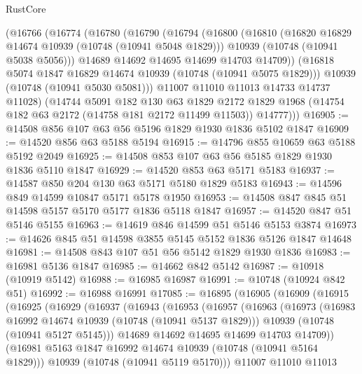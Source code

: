 \begin{lexlean}{RustCore}
\begin{coremodule}
    (@16766
      (@16774
        (@16780
          (@16790
            (@16794
              (@16800
                (@16810
                  (@16820 @16829 @14674 @10939 (@10748 (@10941 @5048 @1829)))
                  @10939
                  (@10748 (@10941 @5038 @5056)))
                @14689
                @14692
                @14695
                @14699
                @14703
                @14709))
            (@16818 @5074 @1847 @16829 @14674 @10939 (@10748 (@10941 @5075 @1829)))
            @10939
            (@10748 (@10941 @5030 @5081)))
          @11007
          @11010
          @11013
          @14733
          @14737
          @11028)
        (@14744
          @5091
          @182
          @130
          @63
          @1829
          @2172
          @1829
          @1968
          (@14754 @182 @63 @2172 (@14758 @181 @2172 @11499 @11503))
          @14777)))
@16905 := @14508 @856 @107 @63 @56 @5196 @1829 @1930 @1836 @5102 @1847
@16909 := @14520 @856 @63 @5188 @5194
@16915 := @14796 @855 @10659 @63 @5188 @5192 @2049
@16925 := @14508 @853 @107 @63 @56 @5185 @1829 @1930 @1836 @5110 @1847
@16929 := @14520 @853 @63 @5171 @5183
@16937 := @14587 @850 @204 @130 @63 @5171 @5180 @1829 @5183
@16943 := @14596 @849 @14599 @10847 @5171 @5178 @1950
@16953 := @14508 @847 @845 @51 @14598 @5157 @5170 @5177 @1836 @5118 @1847
@16957 := @14520 @847 @51 @5146 @5155
@16963 := @14619 @846 @14599 @51 @5146 @5153 @3874
@16973 := @14626 @845 @51 @14598 @3855 @5145 @5152 @1836 @5126 @1847 @14648
@16981 := @14508 @843 @107 @51 @56 @5142 @1829 @1930 @1836
@16983 := @16981 @5136 @1847
@16985 := @14662 @842 @5142
@16987 := @10918 (@10919 @5142)
@16988 := @16985 @16987
@16991 := @10748 (@10924 @842 @51)
@16992 := @16988 @16991
@17085 := @16895
    (@16905
      (@16909
        (@16915
          (@16925
            (@16929
              (@16937
                (@16943
                  (@16953
                    (@16957
                      (@16963
                        (@16973
                          (@16983 @16992 @14674 @10939 (@10748 (@10941 @5137 @1829)))
                          @10939
                          (@10748 (@10941 @5127 @5145)))
                        @14689
                        @14692
                        @14695
                        @14699
                        @14703
                        @14709))
                    (@16981 @5163 @1847 @16992 @14674 @10939 (@10748 (@10941 @5164 @1829)))
                    @10939
                    (@10748 (@10941 @5119 @5170)))
                  @11007
                  @11010
                  @11013

\end{coremodule}
\end{lexlean}
